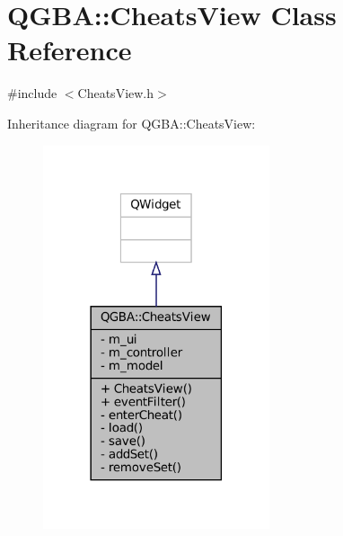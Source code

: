 \hypertarget{class_q_g_b_a_1_1_cheats_view}{}\section{Q\+G\+BA\+:\+:Cheats\+View Class Reference}
\label{class_q_g_b_a_1_1_cheats_view}


{\ttfamily \#include $<$Cheats\+View.\+h$>$}



Inheritance diagram for Q\+G\+BA\+:\+:Cheats\+View\+:
\nopagebreak
\begin{figure}[H]
\begin{center}
\leavevmode
\includegraphics[width=189pt]{class_q_g_b_a_1_1_cheats_view__inherit__graph}
\end{center}
\end{figure}


